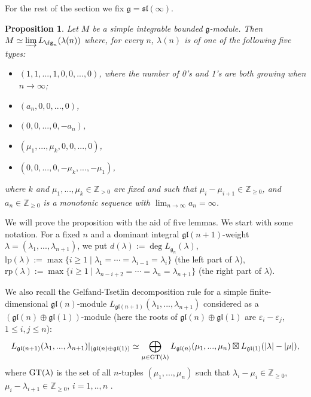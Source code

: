 \documentclass[12pt]{amsart}
\def\gg{\mathfrak{g}}
\def\gl{\mathfrak{l}}
\newtheorem{prop}[thm]{Proposition}
\begin{document}
For the rest of the section we fix $\gg = \mathfrak{sl}(\infty)$. 

\begin{prop} \label{prop-integ-bounded}
Let $M$ be a simple integrable bounded $\gg$-module.
Then $M\simeq\underrightarrow\lim \,L_{\fg_n}(\lambda(n))$ where, for every $n$, $\lambda(n)$ is of one of the following five types:

\begin{itemize}
\item[(i)] $(1,1,...,1,0,0,...,0)$, where the number of 0's and 1's are both growing when $n\to \infty$;
\item[(ii)]  $(a_n,0,0,...,0)$,
\item[(iii)] $(0,0,...,0, -a_n)$,
\item[(iv)] $(\mu_1,...,\mu_k,0,0,...,0)$,
\item[(v)] $(0,0,...,0, - \mu_k,...,-\mu_1)$,
\end{itemize}
where $k$ and $\mu_1,...,\mu_k\in\mathbb{Z}_{>0}$ are fixed and such that $\mu_i - \mu_{i+1}  \in {\mathbb Z}_{\geq 0}$, and   $a_n \in {\mathbb Z}_{\geq 0}$ is a monotonic sequence with $\lim_{n\to \infty}a_n=\infty$.
\end{prop}

We will prove the proposition with the aid of five lemmas. We start with some notation. For a fixed $n$ and a dominant integral $\gg \gl(n+1)$-weight $\lambda = (\lambda_1,...,\lambda_{n+1})$, we put $d(\lambda) := \deg L_{\gg_{n}} (\lambda) $, $\mbox{lp}(\lambda) := \max \{ i \geq 1 \; | \; \lambda_1 = \cdots = \lambda_{i-1} = \lambda_i\}$ (the left part of $\lambda$), $\mbox{rp}(\lambda) := \max \{ i \geq 1 \; | \; \lambda_{n-i+2} =\cdots =\lambda_{n} = \lambda_{n+1}\}$ (the right part of $\lambda$). 

We also recall the Gelfand-Tsetlin decomposition rule for a simple finite-dimensional $\mathfrak{gl}(n)$-module $L_{\mathfrak{gl}({n+1})}(\lambda_1,...,\lambda_{n+1})$ considered as a $\left( \mathfrak{gl}({n}) \oplus \mathfrak{gl}(1)\right)$-module (here the roots of $\mathfrak{gl}(n) \oplus \mathfrak{gl}(1)$ are $\varepsilon_i-\varepsilon_j$, $1\leq i,j \leq n$):
\begin{equation} \label{gt-rule}
L_{\mathfrak{gl}({n+1})}(\lambda_1,...,\lambda_{n+1})|_{\left( \mathfrak{gl}({n}) \oplus \mathfrak{gl}(1)\right)} \simeq \bigoplus_{\mu \in {\rm GT} (\lambda)} L_{\mathfrak{gl}({n})}(\mu_1,...,\mu_{n}) \boxtimes L_{\mathfrak{gl}({1})}(|\lambda|-|\mu|), 
\end{equation}
where ${\rm GT}(\lambda)$ is the set of all $n$-tuples $(\mu_1,..., \mu_n)$ such that $\lambda_i - \mu_{i} \in {\mathbb Z}_{\geq 0}$, $\mu_i - \lambda_{i+1} \in {\mathbb Z}_{\geq 0}$, $i = 1,..,n$ \cite{Zh}.
\end{document}
